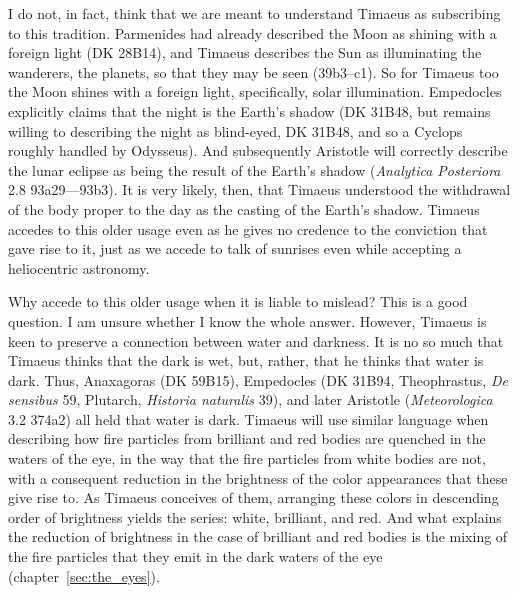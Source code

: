 I do not, in fact, think that we are meant to understand Timaeus as subscribing to this tradition. Parmenides had already described the Moon as shining with a foreign light (DK 28B14), and Timaeus describes the Sun as illuminating the wanderers, the planets, so that they may be seen (39b3--c1). So for Timaeus too the Moon shines with a foreign light, specifically, solar illumination. Empedocles explicitly claims that the night is the Earth's shadow (DK 31B48, but remains willing to describing the night as blind-eyed, DK 31B48, and so a Cyclops roughly handled by Odysseus). And subsequently Aristotle will correctly describe the lunar eclipse as being the result of the Earth's shadow (\emph{Analytica Posteriora} 2.8 93a29—93b3). It is very likely, then, that Timaeus understood the withdrawal of the body proper to the day as the casting of the Earth's shadow. Timaeus accedes to this older usage even as he gives no credence to the conviction that gave rise to it, just as we accede to talk of sunrises even while accepting a heliocentric astronomy. 

Why accede to this older usage when it is liable to mislead? This is a good question. I am unsure whether I know the whole answer. However, Timaeus is keen to preserve a connection between water and darkness. It is no so much that Timaeus thinks that the dark is wet, but, rather, that he thinks that water is dark. Thus, Anaxagoras (DK 59B15), Empedocles (DK 31B94, Theophrastus, \emph{De sensibus} 59, Plutarch, \emph{Historia naturalis} 39), and later Aristotle (\emph{Meteorologica} 3.2 374a2) all held that water is dark. Timaeus will use similar language when describing how fire particles from brilliant and red bodies are quenched in the waters of the eye, in the way that the fire particles from white bodies are not, with a consequent reduction in the brightness of the color appearances that these give rise to. As Timaeus conceives of them, arranging these colors in descending order of brightness yields the series: white, brilliant, and red. And what explains the reduction of brightness in the case of brilliant and red bodies is the mixing of the fire particles that they emit in the dark waters of the eye (chapter~\ref{sec:the_eyes}). 

